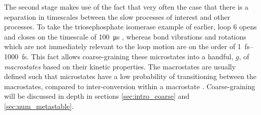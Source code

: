 The second stage makes use of the fact that very often the case that there is a separation in timescales between the slow processes of interest and other processes. To take the triosephosphate isomerase example of earlier, loop 6 opens and closes on the timescale of \SI{100}{\micro\second} \cite{LoopMotionTriosephosphate}, whereas bond vibrations and rotations which are not immediately relevant to the loop motion are on the order of \SIrange{1}{1000}{\femto\second}. This fact allows coarse-graining these microstates into a handful, $g$, of \emph{macrostates} based on their kinetic properties. The macrostates are usually defined such that microstates have a low probability of transitioning between the macrostates, compared to inter-conversion within a macrostate \cite{schutteDirectApproachConformational1999,swopeDescribingProteinFolding2004, prinzMarkovModelsMolecular2011}. Coarse-graining will be discussed in depth in sections \ref{sec:intro_coarse} and \ref{sec:num_metastable}. 



